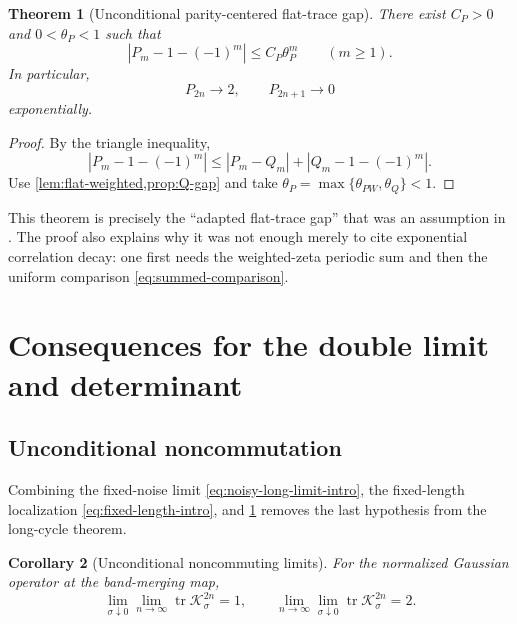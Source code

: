 \documentclass[11pt]{article}
\newtheorem{theorem}{Theorem}[section]
\newtheorem{corollary}[theorem]{Corollary}
\theoremstyle{definition}
\theoremstyle{remark}
\newcommand{\tr}{\operatorname{tr}}
\newcommand{\cK}{\mathcal K}
\begin{document}
\begin{theorem}[Unconditional parity-centered flat-trace gap]
\label{thm:flat-gap}
There exist $C_P>0$ and $0<\theta_P<1$ such that
\begin{equation}\label{eq:flat-gap}
 \boxed{
 |P_m-1-(-1)^m|\le C_P\theta_P^m
 }
 \qquad(m\ge1).
\end{equation}
In particular,
\begin{equation}\label{eq:P-limits}
 P_{2n}\longrightarrow2,
 \qquad
 P_{2n+1}\longrightarrow0
\end{equation}
exponentially.
\end{theorem}

\begin{proof}
By the triangle inequality,
\begin{equation}\label{eq:triangle-gap}
 |P_m-1-(-1)^m|
 \le |P_m-Q_m|+|Q_m-1-(-1)^m|.
\end{equation}
Use \cref{lem:flat-weighted,prop:Q-gap} and take
$\theta_P=\max\{\theta_{PW},\theta_Q\}<1$.
\end{proof}

This theorem is precisely the ``adapted flat-trace gap'' that was an
assumption in \citet{WangLongCycle2026}.  The proof also explains why it was
not enough merely to cite exponential correlation decay: one first needs the
weighted-zeta periodic sum and then the uniform comparison
\eqref{eq:summed-comparison}.

\section{Consequences for the double limit and determinant}
\label{sec:consequences}

\subsection{Unconditional noncommutation}

Combining the fixed-noise limit \eqref{eq:noisy-long-limit-intro}, the
fixed-length localization \eqref{eq:fixed-length-intro}, and
\cref{thm:flat-gap} removes the last hypothesis from the long-cycle theorem.

\begin{corollary}[Unconditional noncommuting limits]
\label{cor:noncommuting}
For the normalized Gaussian operator at the band-merging map,
\begin{equation}\label{eq:noncommuting}
 \lim_{\sigma\downarrow0}\lim_{n\to\infty}
 \tr\cK_\sigma^{2n}=1,
 \qquad
 \lim_{n\to\infty}\lim_{\sigma\downarrow0}
 \tr\cK_\sigma^{2n}=2.
\end{equation}
\end{corollary}
\end{document}
